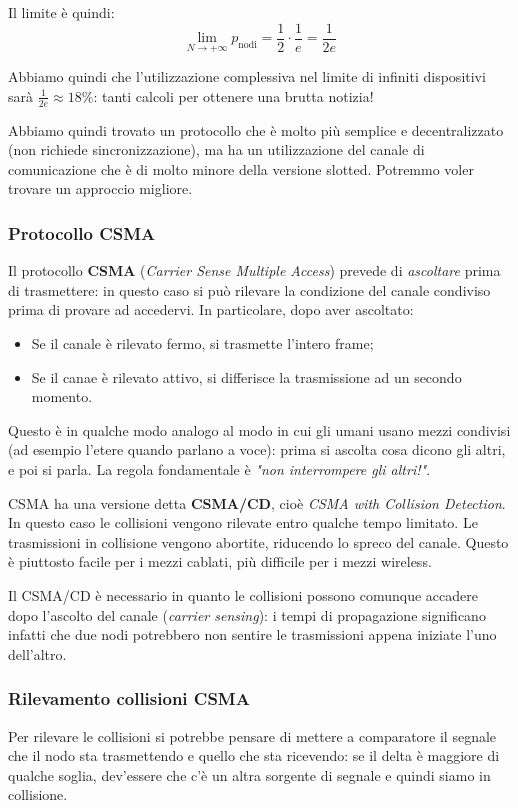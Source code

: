 \documentclass[a4paper,11pt]{article}
\begin{document}
Il limite è quindi:
$$
\lim_{N \rightarrow + \infty} p_\text{nodi} = \frac{1}{2} \cdot \frac{1}{e} = \frac{1}{2e}
$$

Abbiamo quindi che l'utilizzazione complessiva nel limite di infiniti dispositivi sarà $\frac{1}{2e} \approx 18\%$: tanti calcoli per ottenere una brutta notizia!

\par\medskip

Abbiamo quindi trovato un protocollo che è molto più semplice e decentralizzato (non richiede sincronizzazione), ma ha un utilizzazione del canale di comunicazione che è di molto minore della versione slotted.
Potremmo voler trovare un approccio migliore.

\subsubsection{Protocollo CSMA}
Il protocollo \textbf{CSMA} (\textit{Carrier Sense Multiple Access}) prevede di \textit{ascoltare} prima di trasmettere: in questo caso si può rilevare la condizione del canale condiviso prima di provare ad accedervi.
In particolare, dopo aver ascoltato:
\begin{itemize}
	\item Se il canale è rilevato fermo, si trasmette l'intero frame;
	\item Se il canae è rilevato attivo, si differisce la trasmissione ad un secondo momento.
\end{itemize}

Questo è in qualche modo analogo al modo in cui gli umani usano mezzi condivisi (ad esempio l'etere quando parlano a voce): prima si ascolta cosa dicono gli altri, e poi si parla. La regola fondamentale è \textit{"non interrompere gli altri!"}.

CSMA ha una versione detta \textbf{CSMA/CD}, cioè \textit{CSMA with Collision Detection}.
In questo caso le collisioni vengono rilevate entro qualche tempo limitato.
Le trasmissioni in collisione vengono abortite, riducendo lo spreco del canale.
Questo è piuttosto facile per i mezzi cablati, più difficile per i mezzi wireless. 

Il CSMA/CD è necessario in quanto le collisioni possono comunque accadere dopo l'ascolto del canale (\textit{carrier sensing}): i tempi di propagazione significano infatti che due nodi potrebbero non sentire le trasmissioni appena iniziate l'uno dell'altro.

\subsubsection{Rilevamento collisioni CSMA}
Per rilevare le collisioni si potrebbe pensare di mettere a comparatore il segnale che il nodo sta trasmettendo e quello che sta ricevendo: se il delta è maggiore di qualche soglia, dev'essere che c'è un altra sorgente di segnale e quindi siamo in collisione.
\end{document}
